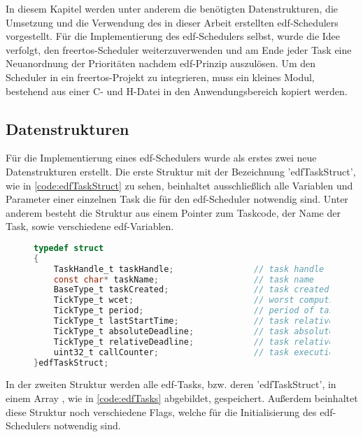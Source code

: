 \documentclass[../EDF Master Thesis.tex]{subfiles}
\begin{document}
In diesem Kapitel werden unter anderem die benötigten Datenstrukturen, die Umsetzung und die Verwendung des in dieser Arbeit erstellten \ac{edf}-Schedulers vorgestellt.
Für die Implementierung des \ac{edf}-Schedulers selbst, wurde die Idee verfolgt, den \ac{freertos}-Scheduler weiterzuverwenden und am Ende jeder Task eine Neuanordnung der Prioritäten nachdem \ac{edf}-Prinzip auszulösen.
Um den Scheduler in ein \ac{freertos}-Projekt zu integrieren, muss ein kleines Modul, bestehend aus einer C- und H-Datei in den Anwendungsbereich kopiert werden.

\subsection{Datenstrukturen} \label{section:datenstruktur}
Für die Implementierung eines \ac{edf}-Schedulers wurde als erstes zwei neue Datenstrukturen erstellt.
Die erste Struktur mit der Bezeichnung 'edfTaskStruct', wie in \autoref{code:edfTaskStruct} zu sehen, beinhaltet ausschließlich alle Variablen und Parameter einer einzelnen Task die für den \ac{edf}-Scheduler notwendig sind.
Unter anderem besteht die Struktur aus einem Pointer zum Taskcode, der Name der Task, sowie verschiedene \ac{edf}-Variablen.

\begin{figure}[ht!]
\begin{lstlisting}[language=C, caption=edfTaskStruct Struktur, label=code:edfTaskStruct]
typedef struct
{
    TaskHandle_t taskHandle;                // task handle
    const char* taskName;                   // task name
    BaseType_t taskCreated;                 // task created flag
    TickType_t wcet;                        // worst compution execution time
    TickType_t period;                      // period of task
    TickType_t lastStartTime;               // task relative deadline
    TickType_t absoluteDeadline;            // task absolute deadline
    TickType_t relativeDeadline;            // task relative deadline
    uint32_t callCounter;                   // task execution counter
}edfTaskStruct;
\end{lstlisting}
\end{figure}

In der zweiten Struktur werden alle \ac{edf}-Tasks, bzw. deren 'edfTaskStruct', in einem Array , wie in \autoref{code:edfTasks} abgebildet, gespeichert.
Außerdem beinhaltet diese Struktur noch verschiedene Flags, welche für die Initialisierung des \ac{edf}-Schedulers notwendig sind.
\end{document}
